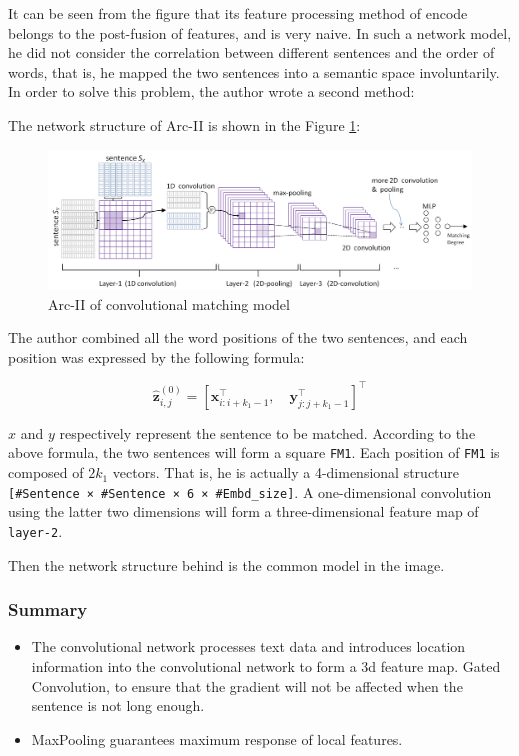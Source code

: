 It can be seen from the figure that its feature processing method of encode belongs to the post-fusion of features, and is very naive. In such a network model, he did not consider the correlation between different sentences and the order of words, that is, he mapped the two sentences into a semantic space involuntarily. In order to solve this problem, the author wrote a second method:

The network structure of Arc-II is shown in the Figure \ref{fig:cnnamnls3}:

\begin{figure}[h!]
\centering
\includegraphics[width=\textwidth]{cnnamnls3.pdf}
\caption{Arc-II of convolutional matching model \cite{hu2015convolutional}}
\label{fig:cnnamnls3}
\end{figure}

The author combined all the word positions of the two sentences, and each position was expressed by the following formula:

$$
\hat{\mathbf{z}}_{i, j}^{(0)}=\left[\mathbf{x}_{i: i+k_{1}-1}^{\top}, \quad \mathbf{y}_{j: j+k_{1}-1}^{\top}\right]^{\top}
$$

$x$ and $y$ respectively represent the sentence to be matched. According to the above formula, the two sentences will form a square \verb|FM1|. Each position of \verb|FM1| is composed of $2k_1$ vectors. That is, he is actually a 4-dimensional structure \verb|[#Sentence × #Sentence × 6 × #Embd_size]|. A one-dimensional convolution using the latter two dimensions will form a three-dimensional feature map of \verb|layer-2|.

Then the network structure behind is the common model in the image.

\subsubsection{Summary}
\begin{itemize}
    \item The convolutional network processes text data and introduces location information into the convolutional network to form a 3d feature map. Gated Convolution, to ensure that the gradient will not be affected when the sentence is not long enough.
    \item MaxPooling guarantees maximum response of local features.
\end{itemize}

